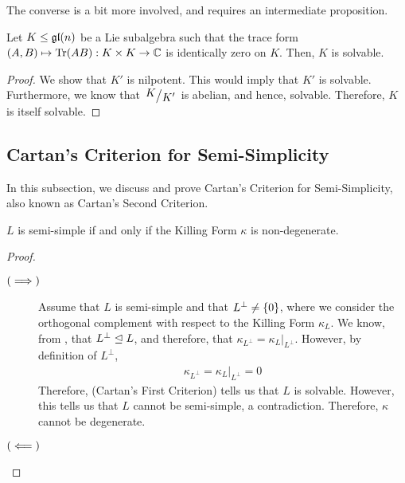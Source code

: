 The converse is a bit more involved, and requires an intermediate proposition.

\begin{proposition}
    Let $K \leq \mathfrak{gl}\!\left( n \right)$ be a Lie subalgebra such that the trace form $\left( A, B \right) \mapsto \operatorname{Tr}\!\left( AB \right) : K \times K \to \mathbb{C}$ is identically zero on $K$. Then, $K$ is solvable.
\end{proposition}
\begin{proof}
    We show that $K'$ is nilpotent. This would imply that $K'$ is solvable. Furthermore, we know that $\quotient{K}{K'}$ is abelian, and hence, solvable. Therefore, $K$ is itself solvable. %

    
\end{proof}

\subsection{Cartan's Criterion for Semi-Simplicity}

In this subsection, we discuss and prove Cartan's Criterion for Semi-Simplicity, also known as Cartan's Second Criterion.

\begin{boxtheorem}\label{SP:Thm:CartanII}
    $L$ is semi-simple if and only if the Killing Form $\kappa$ is non-degenerate.
\end{boxtheorem}
\begin{proof}
    \begin{description}
        \item[$\left( \implies \right)$]
        Assume that $L$ is semi-simple and that $L^\perp \neq \left\{ 0 \right\}$, where we consider the orthogonal complement with respect to the Killing Form $\kappa_L$. We know, from , that $L^\perp \trianglelefteq L$, and therefore, that $\kappa_{L^\perp} = \kappa_L\vert_{L^\perp}$. However, by definition of $L^\perp$,
        \begin{align*}
            \kappa_{L^\perp} = \kappa_L\vert_{L^\perp} = 0
        \end{align*}
        Therefore,  (Cartan's First Criterion) tells us that $L$ is solvable. However, this tells us that $L$ cannot be semi-simple, a contradiction. Therefore, $\kappa$ cannot be degenerate.
        
        \item[$\left( \impliedby \right)$] \sorry %
    \end{description}
\end{proof}

